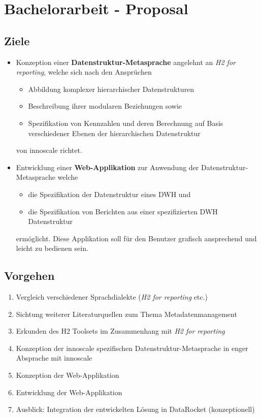 \chapter{Bachelorarbeit - Proposal}


\section{Ziele}
\begin{itemize}
  \item Konzeption einer \textbf{Datenstruktur-Metasprache} angelehnt an
    \textit{H2 for reporting}, welche sich nach den Ansprüchen 
    \begin{itemize}
      \item Abbildung komplexer hierarchischer Datenstrukturen
      \item Beschreibung ihrer modularen Beziehungen sowie
      \item Spezifikation von Kennzahlen und deren Berechnung auf Basis
        verschiedener Ebenen der hierarchischen Datenstruktur
    \end{itemize}
    von innoscale richtet.
  \item Entwicklung einer \textbf{Web-Applikation} zur Anwendung der
    Datenstruktur-Metasprache welche
    \begin{itemize}
      \item die Spezifikation der Datenstruktur eines \acrshort{DWH} und
      \item die Spezifikation von Berichten aus einer spezifizierten
        \acrshort{DWH} Datenstruktur
    \end{itemize}
    ermöglicht. Diese Applikation soll für den Benutzer grafisch ansprechend
    und leicht zu bedienen sein.
\end{itemize}


\section{Vorgehen}
\begin{enumerate}
  \item Vergleich verschiedener Sprachdialekte (\textit{H2 for reporting} etc.)
  \item Sichtung weiterer Literaturquellen zum Thema Metadatenmanagement
  \item Erkunden des H2 Toolsets im Zusammenhang mit \textit{H2 for
    reporting}
  \item Konzeption der innoscale spezifischen Datenstruktur-Metasprache in
    enger Absprache mit innoscale
  \item Konzeption der Web-Applikation
  \item Entwicklung der Web-Applikation
  \item Ausblick: Integration der entwickelten Lösung in DataRocket
    (konzeptionell)
\end{enumerate}


